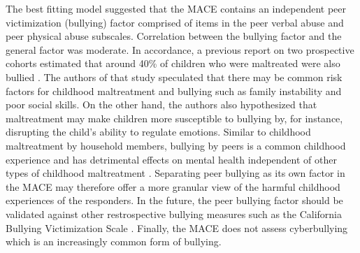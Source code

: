 \documentclass[letterpaper,man,natbib]{apa6}  %
\begin{document}
The best fitting model suggested that the MACE contains an independent peer victimization (bullying) factor comprised of items in the peer verbal abuse and peer physical abuse subscales. Correlation between the bullying factor and the general factor was moderate. In accordance, a previous report on two prospective cohorts estimated that around 40\% of children who were maltreated were also bullied \citep{lereya2015adult}. The authors of that study speculated that there may be common risk factors for childhood maltreatment and bullying such as family instability and poor social skills. On the other hand, the authors also hypothesized that maltreatment may make children more susceptible to bullying by, for instance, disrupting the child's ability to regulate emotions. Similar to childhood maltreatment by household members, bullying by peers is a common childhood experience \citep{world2020spotlight} and has detrimental effects on mental health independent of other types of childhood maltreatment \citep{singham2017concurrent, lereya2015adult}. Separating peer bullying as its own factor in the MACE may therefore offer a more granular view of the harmful childhood experiences of the responders. In the future, the peer bullying factor should be validated against other restrospective bullying measures such as the California Bullying Victimization Scale \citep{green2018initial}. Finally, the MACE does not assess cyberbullying which is an increasingly common form of bullying. 





\end{document}
